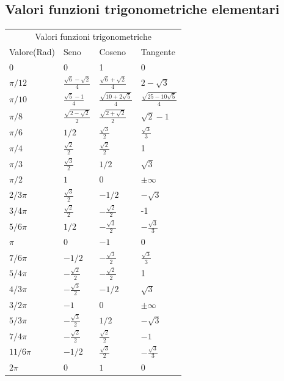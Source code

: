 \documentclass[12pt]{article}
\newenvironment{para}{\begin{adjustwidth}{13mm}{}}{\end{adjustwidth}}
\begin{document}
\begin{para}
\subsection{Valori funzioni trigonometriche elementari}
\begin{tabular}{ |p{3cm}||p{3cm}|p{3cm}|p{3cm}|}
\hline
 \multicolumn{4}{|c|}{Valori funzioni trigonometriche} \\
 Valore(Rad) & Seno & Coseno & Tangente \\
 \hline
 0 & 0 & 1 & 0 \\
 \hline
 $\pi/12$ & $\frac{\sqrt{6}-\sqrt{2}}{4}$ &  $\frac{\sqrt{6}+\sqrt{2}}{4}$ & $2 - \sqrt{3}$ \\
 \hline
 $\pi/10$ & $\frac{\sqrt{5}-1}{4}$ & $\frac{\sqrt{10+ 2\sqrt{5}}}{4}$ &$\frac{\sqrt{25-10\sqrt{5}}}{4}$ \\
 \hline
 $\pi/8$ & $\frac{\sqrt{2- \sqrt{2}}}{2}$ & \textbf{$\frac{\sqrt{2+ \sqrt{2}}}{2}$} & $\sqrt{2}-1$ \\
 \hline
 $\pi/6$ & $1/2$ & $\frac{\sqrt{3}}{2}$ & $\frac{\sqrt{3}}{3}$ \\
 \hline
 $\pi/4$ & $\frac{\sqrt{2}}{2}$ & $\frac{\sqrt{2}}{2}$ & 1 \\
 \hline
 $\pi/3$ & $\frac{\sqrt{3}}{2}$ & $1/2$ & $\sqrt{3}$ \\
 \hline
 $\pi/2$ & $1$ & $0$ & $\pm \infty$ \\
 \hline
 $2/3 \pi$ & $\frac{\sqrt{3}}{2}$ & $-1/2$ & $-\sqrt{3}$ \\
 \hline
 $3/4 \pi$ & $\frac{\sqrt{2}}{2}$ & $-\frac{\sqrt{2}}{2}$ & -1 \\
 \hline
 $5/6 \pi$ & $1/2$ & $-\frac{\sqrt{3}}{2}$ & $-\frac{\sqrt{3}}{3}$ \\
 \hline
 $\pi$ & $0$ & $-1$ & $0$ \\
 \hline
 $7/6\pi$ & $-1/2$ & $-\frac{\sqrt{3}}{2}$ & $\frac{\sqrt{3}}{3}$ \\
 \hline
 $5/4\pi$ & $-\frac{\sqrt{2}}{2}$ & $-\frac{\sqrt{2}}{2}$ & 1 \\
 \hline
 $4/3\pi$ & $-\frac{\sqrt{3}}{2}$ & $-1/2$ & $\sqrt{3}$ \\
 \hline
 $3/2\pi$ & $-1$ & 0 & $\pm \infty$ \\
 \hline
 $5/3 \pi$ & $-\frac{\sqrt{3}}{2}$ & $1/2$ & $-\sqrt{3}$ \\
 \hline
 $7/4 \pi$ & $-\frac{\sqrt{2}}{2}$ & $\frac{\sqrt{2}}{2}$ & $-1$ \\
 \hline
 $11/6 \pi$ & $-1/2$ & $\frac{\sqrt{3}}{2}$ & $-\frac{\sqrt{3}}{3}$ \\
 \hline
 $2\pi$ & $0$ & $1$ & $0$ \\
 \hline
\end{tabular}
\newpage

\end{para}
\end{document}
